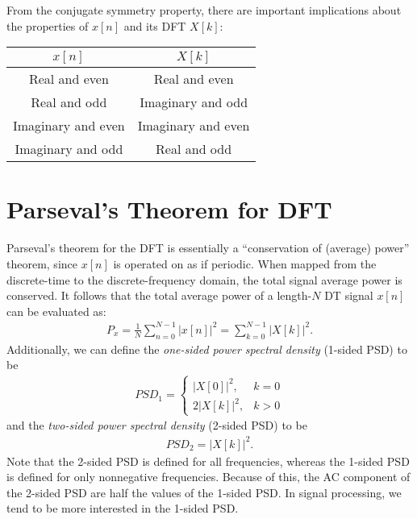 \documentclass{report}
\begin{document}
\pagebreak
From the conjugate symmetry property, there are important implications about the properties of $x[n]$ and its DFT $X[k]$:
\begin{center}
    \begin{tabular}{|c|c|}
        \hline
        $x[n]$ & $X[k]$ \\
        \hline
        Real and even & Real and even \\
        Real and odd & Imaginary and odd \\
        Imaginary and even & Imaginary and even \\
        Imaginary and odd & Real and odd \\
        \hline
    \end{tabular}
\end{center}

\section{Parseval's Theorem for DFT}
Parseval's theorem for the DFT is essentially a ``conservation of (average) power'' theorem, since $x[n]$ is operated on as if periodic. When mapped from the discrete-time 
to the discrete-frequency domain, the total signal average power is conserved. It follows that the total average power of a length-$N$ DT signal $x[n]$ can be evaluated as: 
\begin{align}
    P_x = \frac{1}{N}\sum_{n=0}^{N-1} |x[n]|^2 = \sum_{k=0}^{N-1} |X[k]|^2.
\end{align}
Additionally, we can define the \emph{one-sided power spectral density} (1-sided PSD) to be 
\begin{align}
    PSD_1 = 
    \begin{cases}
        |X[0]|^2, & k=0 \\
        2|X[k]|^2, & k>0
    \end{cases}
\end{align}
and the \emph{two-sided power spectral density} (2-sided PSD) to be 
\begin{align}
    PSD_2 = |X[k]|^2.
\end{align}
Note that the 2-sided PSD is defined for all frequencies, whereas the 1-sided PSD is defined for only nonnegative frequencies. 
Because of this, the AC component of the 2-sided PSD are half the values of the 1-sided PSD. In signal processing, we tend to be more interested in the 1-sided PSD.
\end{document}

